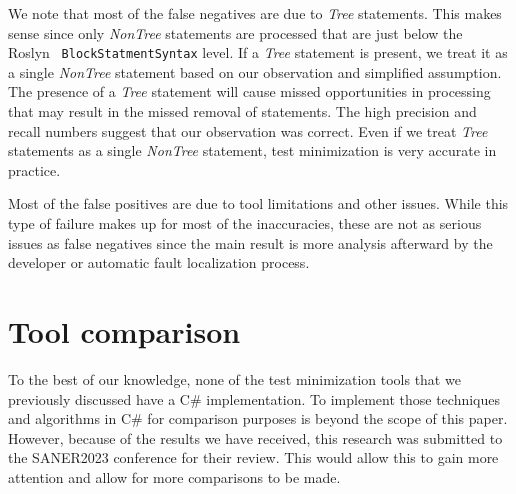 We note that most of the false negatives are due to \emph{Tree} statements. This makes sense since only \emph{NonTree} statements are processed that are just below the Roslyn~\cite{wagner_2021} \texttt{BlockStatmentSyntax} level. If a \emph{Tree} statement is present, we treat it as a single \emph{NonTree} statement based on our observation and simplified assumption. The presence of a \emph{Tree} statement will cause missed opportunities in processing that may result in the missed removal of statements. The high precision and recall numbers suggest that our observation was correct. Even if we treat \emph{Tree} statements as a single \emph{NonTree} statement, test minimization is very accurate in practice.

Most of the false positives are due to tool limitations and other issues. While this type of failure makes up for most of the inaccuracies, these are not as serious issues as false negatives since the main result is more analysis afterward by the developer or automatic fault localization process.

\section{Tool comparison}
To the best of our knowledge, none of the test minimization tools that we previously discussed have a C\# implementation. To implement those techniques and algorithms in C\# for comparison purposes is beyond the scope of this paper. However, because of the results we have received, this research was submitted to the SANER2023 conference for their review. This would allow this to gain more attention and allow for more comparisons to be made.


